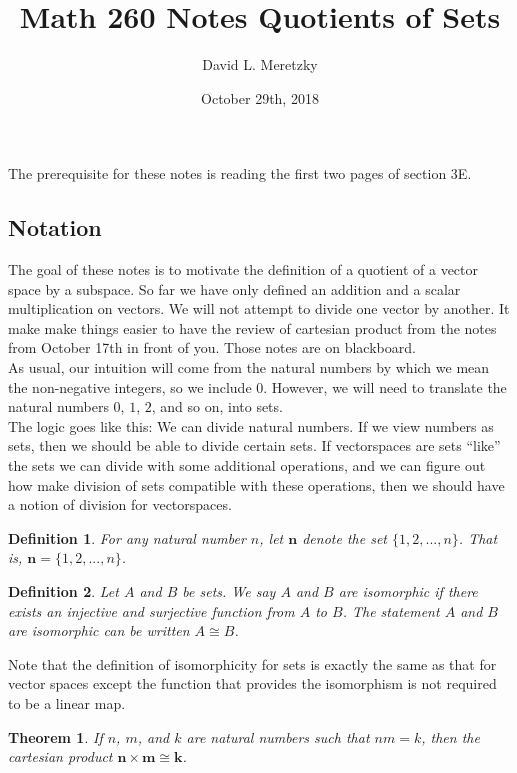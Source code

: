 \documentclass{article}
\title{ \vspace{-10ex} %
Math 260 Notes Quotients of Sets
}
\author{David L. Meretzky
}
\date{%
October 29th, 2018
}
\theoremstyle{problemstyle}
\newtheorem{theorem}{Theorem}
\newtheorem{definition}{Definition}
\begin{document}
\maketitle

The prerequisite for these notes is reading the first two pages of section 3E. 

\subsection*{Notation}

The goal of these notes is to motivate the definition of a quotient of a vector space by a subspace. So far we have only defined an addition and a scalar multiplication on vectors. We will not attempt to divide one vector by another. It make make things easier to have the review of cartesian product from the notes from October 17th in front of you. Those notes are on blackboard.\\

As usual, our intuition will come from the natural numbers by which we mean the non-negative integers, so we include $0$. However, we will need to translate the natural numbers $0$, $1$, $2$, and so on, into sets. \\ 

The logic goes like this: We can divide natural numbers. If we view numbers as sets, then we should be able to divide certain sets. If vectorspaces are sets ``like'' the sets we can divide with some additional operations, and we can figure out how make division of sets compatible with these operations, then we should have a notion of division for vectorspaces. 

\begin{definition}
For any natural number $n$, let $\textbf{n}$ denote the set $\{1,2,...,n\}$. That is, $\textbf{n} = \{1,2,...,n\}$. 
\end{definition}

\begin{definition}
Let $A$ and $B$ be sets.  We say $A$ and $B$ are isomorphic if there exists an injective and surjective function from $A$ to $B$. The statement $A$ and $B$ are isomorphic can be written $A \cong B$. 
\end{definition}

Note that the definition of isomorphicity for sets is exactly the same as that for vector spaces except the function that provides the isomorphism is not required to be a linear map. 

\begin{theorem}
If $n$, $m$, and $k$ are natural numbers such that $nm = k$, then the cartesian product $\textbf{n} \times \textbf{m} \cong \textbf{k}$. 
\end{theorem}
\end{document}
